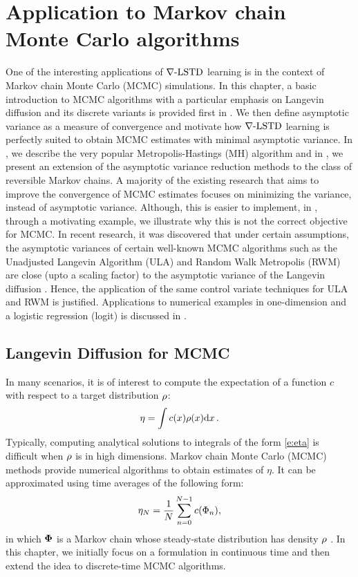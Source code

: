 \chapter{Application to Markov chain Monte Carlo algorithms}
\label{ch:mcmc}
One of the interesting applications of $\nabla\text{-LSTD}$ learning is in the context of Markov chain Monte Carlo (MCMC) simulations. In this chapter, a basic introduction to MCMC algorithms with a particular emphasis on Langevin diffusion and its discrete variants is provided first in . We then define asymptotic variance as a measure of convergence and motivate how $\nabla\text{-LSTD}$ learning is perfectly suited to obtain MCMC estimates with minimal asymptotic variance. In , we describe the very popular Metropolis-Hastings (MH) algorithm and in , we present an extension of the asymptotic variance reduction methods to the class of reversible Markov chains. A majority of the existing research that aims to improve the convergence of MCMC estimates focuses on minimizing the variance, instead of asymptotic variance. Although, this is easier to implement, in , through a motivating example, we illustrate why this is not the correct objective for MCMC. 
In recent research, it was discovered that under certain assumptions, the asymptotic variances of certain well-known MCMC algorithms such as the Unadjusted Langevin Algorithm (ULA) and Random Walk Metropolis (RWM) are close (upto a scaling factor) to the asymptotic variance of the Langevin diffusion \cite{brodurmeymourad18}. Hence, the application of the same control variate techniques for ULA and RWM is justified.  Applications to numerical examples in one-dimension and a logistic regression (logit) is discussed in . 
\section{Langevin Diffusion for MCMC}
\label{s:mcmc_langevin}
In many scenarios, it is of interest to compute the expectation of a function $c$ with respect to a target distribution $\rho$:
\begin{equation}
\eta = \int c(x)\pr(x)\ud x\, .
\label{e:eta}
\end{equation} 
Typically, computing analytical solutions to integrals of the form \eqref{e:eta} is difficult when $\rho$ is in high dimensions. Markov chain Monte Carlo (MCMC) methods provide numerical algorithms to obtain estimates of $\eta$. It can be approximated using time averages of the following form:
\begin{equation}
\eta_N =\frac{1}{N}\sum_{n=0}^{N-1} c(\markovstate_n),
\label{e:sample_mean_HM}
\end{equation}
in which $\boldsymbol{\Phi}$ is a Markov chain whose steady-state distribution has density $\rho$ \cite{asmgly07,MT}.
In this chapter, we initially focus on a formulation in continuous time and then extend the idea to discrete-time MCMC algorithms.

